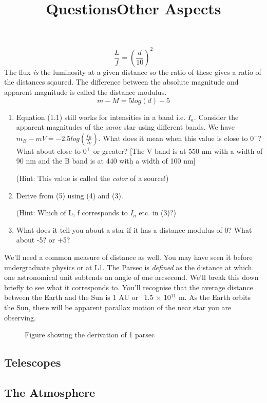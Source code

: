 \begin{equation}
\frac{L}{f} = (\frac{d}{10})^{2}
\end{equation}
The flux \textit{is} the luminosity at a given distance so the ratio of these gives a ratio of the distances sqaured. The difference between the absolute magnitude and apparent magnitude is called the distance modulus. 
\begin{equation}
m - M = 5log(d) -5
\end{equation}
\title{\large{Questions}}
\begin{enumerate}
	\item Equation (1.1) still works for intensities in a band i.e. $I_{a}$. Consider the apparent magnitudes of the \textit{same} star using different bands. We have $m_{B} - m{V} = -2.5log(\frac{I_{B}}{I_{V}})$. What does it mean when this value is close to $0^{-}$? What about close to $0^{+}$ or greater? [The V band is at 550 nm with a width of 90 nm and the B band is at 440 with a width of 100 nm] \par (Hint: This value is called the \textit{color} of a source!)
	\item Derive from (5) using (4) and (3).\par (Hint: Which of L, f corresponds to $I_a$ etc. in (3)?) 
	\item What does it tell you about a star if it has a distance modulus of 0? What about -5? or +5? 
\end{enumerate}
\title{\large{Other Aspects}}
We'll need a common measure of distance as well. You may have seen it before undergraduate physics or at L1. The Parsec is \textit{defined} as the distance at which one astronomical unit subtends an angle of one arcsecond. We'll break this down briefly to see what it corresponds to. You'll recognise that the average distance between the Earth and the Sun is 1 AU or ~1.5 $\times$ 10${}^{11}$ m. As the Earth orbits the Sun, there will be apparent parallax motion of the near star you are observing.
\begin{figure}
\centering
{}
\caption{Figure showing the derivation of 1 parsec}
\end{figure}












\subsection{Telescopes}
\subsection{The Atmosphere}
